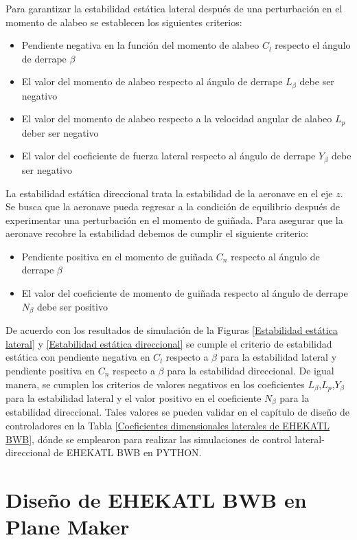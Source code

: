 Para garantizar la estabilidad estática lateral después de una perturbación en el momento de alabeo se establecen los siguientes criterios:
\begin{itemize}
    \item Pendiente negativa en la función del momento de alabeo $C_l$ respecto el ángulo de derrape $\beta$
    \item El valor del momento de alabeo respecto al ángulo de derrape $L_\beta$ debe ser negativo
    \item  El valor del momento de alabeo respecto a la velocidad angular de alabeo $L_p$ deber ser negativo
    \item El valor del coeficiente de fuerza lateral respecto al ángulo de derrape $Y_{\beta}$ debe ser negativo
\end{itemize}

La estabilidad estática direccional trata la estabilidad de la aeronave en el eje $z$.
Se busca que la aeronave pueda regresar a la condición de equilibrio después de experimentar una perturbación en el momento de guiñada.
Para asegurar que la aeronave recobre la estabilidad debemos de cumplir el siguiente criterio:
\begin{itemize}
    \item Pendiente positiva en el momento de guiñada $C_n$ respecto al ángulo de derrape $\beta$
    \item El valor del coeficiente de momento de guiñada respecto al ángulo de derrape $N_\beta$ debe ser positivo
\end{itemize}

De acuerdo con los resultados de simulación de la Figuras \ref{Estabilidad estática lateral} y \ref{Estabilidad estática direccional} se cumple el criterio de estabilidad estática con pendiente negativa en $C_l$ respecto a $\beta$ para la estabilidad lateral y pendiente positiva en $C_n$ respecto a $\beta$ para la estabilidad direccional. 
De igual manera, se cumplen los criterios de valores negativos en los coeficientes $L_\beta$,$L_p$,$Y_{\beta}$ para la estabilidad lateral y el valor positivo en el coeficiente $N_\beta$ para la estabilidad direccional. Tales valores se pueden validar en el capítulo de diseño de controladores en la Tabla \ref{Coeficientes dimensionales laterales de EHEKATL BWB}, dónde se emplearon para realizar las simulaciones de control lateral-direccional de EHEKATL BWB en PYTHON. 

\section{Diseño de EHEKATL BWB en Plane Maker}


